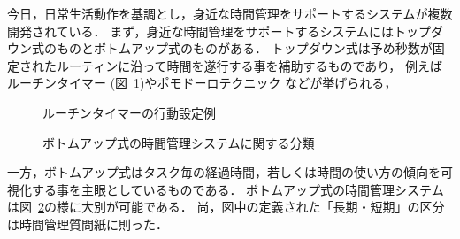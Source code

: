 今日，日常生活動作を基調とし，身近な時間管理をサポートするシステムが複数開発されている．
まず，身近な時間管理をサポートするシステムにはトップダウン式のものとボトムアップ式のものがある．
トップダウン式は予め秒数が固定されたルーティンに沿って時間を遂行する事を補助するものであり，
例えばルーチンタイマー\cite{RoutineTimer} (図~\ref{fig:routine})やポモドーロテクニック\cite{pomodoro} などが挙げられる，

\begin{figure}[hb]
	\begin{center}
		\caption{ルーチンタイマーの行動設定例}
		\label{fig:routine}
	\end{center}
\end{figure}

\begin{figure}[hb]
	\begin{center}
		\caption{ボトムアップ式の時間管理システムに関する分類}
		\label{fig:bottomup}
	\end{center}
\end{figure}

一方，ボトムアップ式はタスク毎の経過時間，若しくは時間の使い方の傾向を可視化する事を主眼としているものである．
ボトムアップ式の時間管理システムは図~\ref{fig:bottomup}の様に大別が可能である．
尚，図中の定義された「長期・短期」の区分は時間管理質問紙\cite{Britton1991}に則った．

